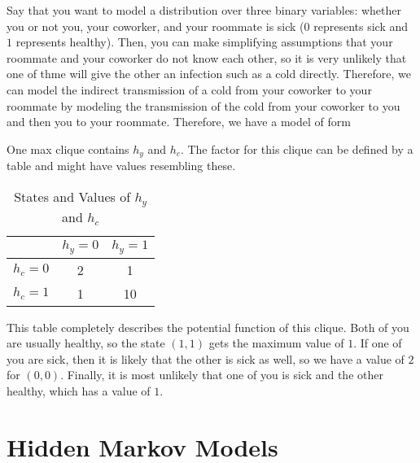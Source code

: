 \documentclass{article}
\begin{document}
  \begin{example} 
    Say that you want to model a distribution over three binary variables: whether you or not you, your coworker, and your roommate is sick ($0$ represents sick and $1$ represents healthy). Then, you can make simplifying assumptions that your roommate and your coworker do not know each other, so it is very unlikely that one of thme will give the other an infection such as a cold directly. Therefore, we can model the indirect transmission of a cold from your coworker to your roommate by modeling the transmission of the cold from your coworker to you and then you to your roommate. Therefore, we have a model of form

    \begin{center}
    \end{center}
    One max clique contains $h_y$ and $h_c$. The factor for this clique can be defined by a table and might have values resembling these. 

    \begin{table}[H]
      \centering
      \begin{tabular}{c|c|c|}
      \cline{2-3}
      & \( h_y = 0 \) & \( h_y = 1 \) \\ \hline
      \multicolumn{1}{|c|}{\( h_c = 0 \)} & 2 & 1 \\ \hline
      \multicolumn{1}{|c|}{\( h_c = 1 \)} & 1 & 10 \\ \hline
      \end{tabular}
      \caption{States and Values of \( h_y \) and \( h_c \)}
    \end{table}

    This table completely describes the potential function of this clique. Both of you are usually healthy, so the state $(1, 1)$ gets the maximum value of $1$. If one of you are sick, then it is likely that the other is sick as well, so we have a value of $2$ for $(0, 0)$. Finally, it is most unlikely that one of you is sick and the other healthy, which has a value of $1$. 
  \end{example}

\section{Hidden Markov Models}



\end{document}
